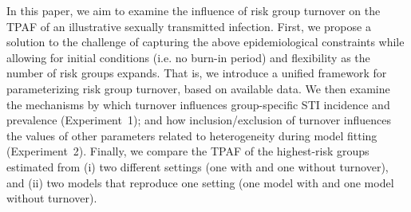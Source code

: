 \par
In this paper, we aim to examine the influence of risk group turnover 
on the TPAF of an illustrative sexually transmitted infection. First, 
we propose a solution to the challenge of capturing the above
epidemiological constraints while allowing for initial conditions (i.e. no burn-in period)
and flexibility as the number of risk groups expands. That is, we
introduce a unified framework for
parameterizing risk group turnover, based on available data.
We then examine the mechanisms by which turnover 
influences group-specific STI incidence and prevalence
(Experiment~1); and how inclusion/exclusion of turnover influences
the values of other parameters related to heterogeneity during model fitting
(Experiment~2). Finally, we compare the TPAF of the highest-risk groups 
estimated from (i) two different settings (one with and one without turnover), 
and (ii) two models that reproduce one setting (one model with and one model without turnover).
